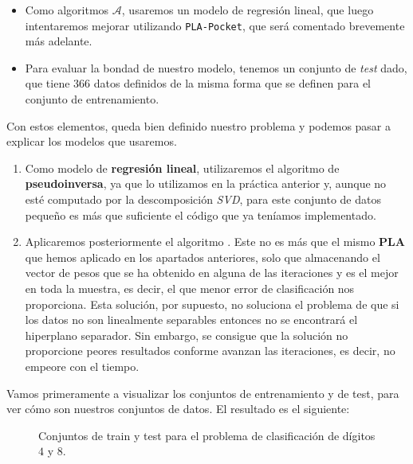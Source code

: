 \documentclass[12pt]{article}
\begin{document}
{\begin{itemize}
\item Como algoritmos $\mathcal A$, usaremos un modelo de regresión lineal, que luego intentaremos mejorar utilizando \lstinline{PLA-Pocket}, que será comentado brevemente más adelante.

\item Para evaluar la bondad de nuestro modelo, tenemos un conjunto de \emph{test} dado, que tiene $366$ datos definidos de la misma forma que se definen para el conjunto de entrenamiento.


\end{itemize}

Con estos elementos, queda bien definido nuestro problema y podemos pasar a explicar los modelos que usaremos. 
\begin{enumerate}
\item Como modelo de \textbf{regresión lineal}, utilizaremos el algoritmo de \textbf{pseudoinversa}, ya que lo utilizamos en la práctica anterior y, aunque no esté computado por la descomposición \emph{SVD}, para este conjunto de datos pequeño es más que suficiente el código que ya teníamos implementado.

\item Aplicaremos posteriormente el algoritmo . Este no es más que el mismo \textbf{PLA} que hemos aplicado en los apartados anteriores, solo que almacenando  el vector de pesos que se ha obtenido en alguna de las iteraciones y es el mejor en toda la muestra, es decir, el que menor error de clasificación nos proporciona. Esta solución, por supuesto, no soluciona el problema de que si los datos no son linealmente separables entonces no se encontrará el hiperplano separador. Sin embargo, se consigue que la solución no proporcione peores resultados conforme avanzan las iteraciones, es decir, no empeore con el tiempo.

\end{enumerate}


Vamos primeramente a visualizar los conjuntos de entrenamiento y de test, para ver cómo son nuestros conjuntos de datos. El resultado es el siguiente:
\begin{figure}[H]
  \centering
  \qquad
  \caption{Conjuntos de train y test para el problema de clasificación de dígitos $4$ y $8$.}
\label{fig:myfig:4}
\end{figure}

}
\end{document}
